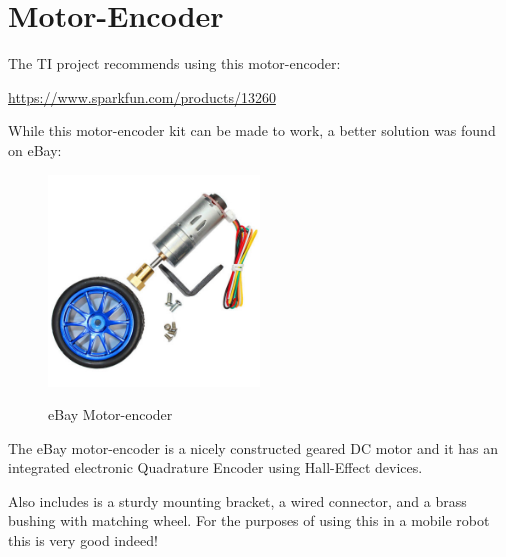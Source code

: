 %
%
%

\chapter{Motor-Encoder}

The TI project recommends using this motor-encoder:

\url{https://www.sparkfun.com/products/13260}

While this motor-encoder kit can be made to work, a better solution was found on eBay:

\begin{figure}[h]
	\centering
    \includegraphics[width=0.5\textwidth]{photos/s-l500.jpg}
	\centering\bfseries
	\caption{eBay Motor-encoder}
\end{figure}

The eBay motor-encoder is a nicely constructed geared DC motor and it has an integrated electronic Quadrature Encoder using Hall-Effect devices.

Also includes is a sturdy mounting bracket, a wired connector, and a brass bushing with matching wheel.  For the purposes of using this in a mobile robot this is very good indeed!

